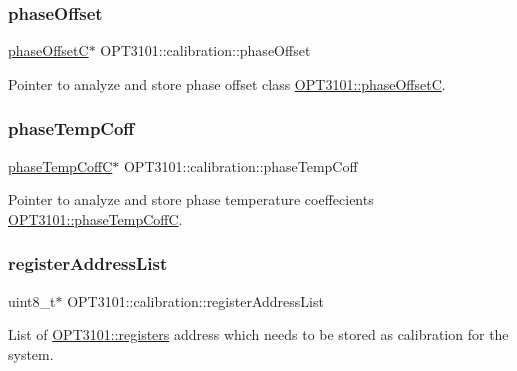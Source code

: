 \subsubsection{\texorpdfstring{phase\+Offset}{phaseOffset}}
{\footnotesize\ttfamily \mbox{\hyperlink{class_o_p_t3101_1_1phase_offset_c}{phase\+OffsetC}}$\ast$ O\+P\+T3101\+::calibration\+::phase\+Offset}



Pointer to analyze and store phase offset class \mbox{\hyperlink{class_o_p_t3101_1_1phase_offset_c}{O\+P\+T3101\+::phase\+OffsetC}}. 

\mbox{\label{class_o_p_t3101_1_1calibration_a15ab9d61ee871815d12cb52c8cd8be55}} 
\subsubsection{\texorpdfstring{phase\+Temp\+Coff}{phaseTempCoff}}
{\footnotesize\ttfamily \mbox{\hyperlink{class_o_p_t3101_1_1phase_temp_coff_c}{phase\+Temp\+CoffC}}$\ast$ O\+P\+T3101\+::calibration\+::phase\+Temp\+Coff}



Pointer to analyze and store phase temperature coeffecients \mbox{\hyperlink{class_o_p_t3101_1_1phase_temp_coff_c}{O\+P\+T3101\+::phase\+Temp\+CoffC}}. 

\mbox{\label{class_o_p_t3101_1_1calibration_a590e645bfaf87fa8145f80b35dfa3b44}} 
\subsubsection{\texorpdfstring{register\+Address\+List}{registerAddressList}}
{\footnotesize\ttfamily uint8\+\_\+t$\ast$ O\+P\+T3101\+::calibration\+::register\+Address\+List}



List of \mbox{\hyperlink{class_o_p_t3101_1_1registers}{O\+P\+T3101\+::registers}} address which needs to be stored as calibration for the system. 

